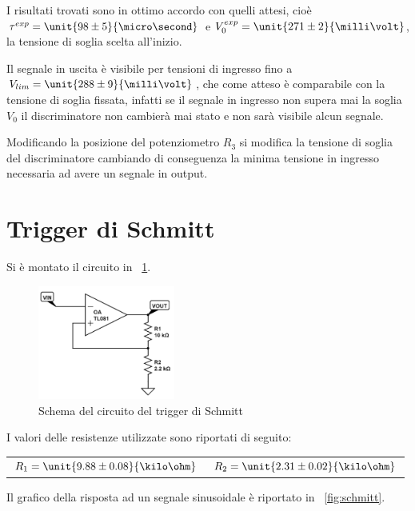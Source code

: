 \documentclass[10pt,a4paper]{article}
\begin{document}
I risultati trovati sono in ottimo accordo con quelli attesi, cioè $\tau^{exp} = \unit{98 \pm 5}{\micro\second}$ e $V_0^{exp} = \unit{271 \pm 2}{\milli\volt}$, la tensione di soglia scelta all'inizio.

Il segnale in uscita è visibile per tensioni di ingresso fino a $V_{lim} = \unit{288 \pm 9}{\milli\volt}$, che come atteso è comparabile con la tensione di soglia fissata, infatti se il segnale in ingresso non supera mai la soglia $V_0$ il discriminatore non cambierà mai stato e non sarà visibile alcun segnale.

Modificando la posizione del potenziometro $R_3$ si modifica la tensione di soglia del discriminatore cambiando di conseguenza la minima tensione in ingresso necessaria ad avere un segnale in output.

\section{Trigger di Schmitt}
Si è montato il circuito in \figurename{~\ref{fig:schmitt_trigger}}.

\begin{figure}[H]
	\centering
	\includegraphics[width=0.40\textwidth]{../circuiti/schmitt_trigger.jpg}
	\caption{Schema del circuito del trigger di Schmitt}
	\label{fig:schmitt_trigger}
\end{figure}

I valori delle resistenze utilizzate sono riportati di seguito:

\begin{table}[H]
	\centering
	\begin{tabular}{cc}
        $ R_1 = \unit{9.88 \pm 0.08}{\kilo\ohm}$  & $R_2 = \unit{2.31 \pm 0.02}{\kilo\ohm}$
	\end{tabular}
\end{table}

Il grafico della risposta ad un segnale sinusoidale è riportato in \figurename{~\ref{fig:schmitt}}.
\end{document}
